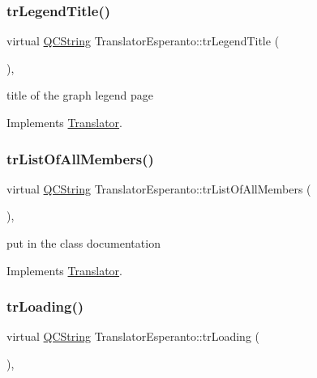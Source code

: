 \subsubsection{\texorpdfstring{trLegendTitle()}{trLegendTitle()}}
{\footnotesize\ttfamily virtual \mbox{\hyperlink{class_q_c_string}{Q\+C\+String}} Translator\+Esperanto\+::tr\+Legend\+Title (\begin{DoxyParamCaption}{ }\end{DoxyParamCaption})\hspace{0.3cm}{\ttfamily [inline]}, {\ttfamily [virtual]}}

title of the graph legend page 

Implements \mbox{\hyperlink{class_translator}{Translator}}.

\mbox{\label{class_translator_esperanto_ad66219a0993a456c9c64c508d6f741b6}} 
\subsubsection{\texorpdfstring{trListOfAllMembers()}{trListOfAllMembers()}}
{\footnotesize\ttfamily virtual \mbox{\hyperlink{class_q_c_string}{Q\+C\+String}} Translator\+Esperanto\+::tr\+List\+Of\+All\+Members (\begin{DoxyParamCaption}{ }\end{DoxyParamCaption})\hspace{0.3cm}{\ttfamily [inline]}, {\ttfamily [virtual]}}

put in the class documentation 

Implements \mbox{\hyperlink{class_translator}{Translator}}.

\mbox{\label{class_translator_esperanto_a9a503569ae3e9a35671eb3959f4a13c5}} 
\subsubsection{\texorpdfstring{trLoading()}{trLoading()}}
{\footnotesize\ttfamily virtual \mbox{\hyperlink{class_q_c_string}{Q\+C\+String}} Translator\+Esperanto\+::tr\+Loading (\begin{DoxyParamCaption}{ }\end{DoxyParamCaption})\hspace{0.3cm}{\ttfamily [inline]}, {\ttfamily [virtual]}}

